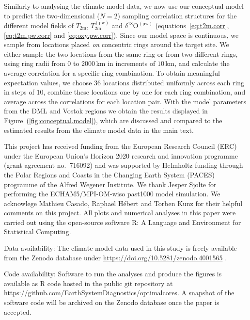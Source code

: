 \documentclass[draft]{agujournal2019}
\begin{document}
Similarly to analysing the climate model data, we now use our conceptual model
to predict the two-dimensional ($N=2$) sampling correlation structures for the
different model fields of $T_{\mathrm{2m}}$, $T_{\mathrm{2m}}^{\mathrm{(pw)}}$
and $\delta^{18}\mathrm{O}^{\mathrm{(pw)}}$ (equations~\ref{eq:t2m.corr},
\ref{eq:t2m.pw.corr} and \ref{eq:oxy.pw.corr}). Since our model space is
continuous, we sample from locations placed \emph{on} concentric rings around
the target site. We either sample the two locations from the same ring or from
two different rings, using ring radii from $0$ to $2000$\,km in increments of
$10$\,km, and calculate the average correlation for a specific ring
combination. To obtain meaningful expectation values, we choose $36$ locations
distributed uniformly across each ring in steps of $10$\textdegree, combine
these locations one by one for each ring combination, and average across the
correlations for each location pair. With the model parameters from the DML and
Vostok regions we obtain the results displayed in
Figure~(\ref{fig:conceptual.model}), which are discussed and compared to the
estimated results from the climate model data in the main text.

\acknowledgments
This project has received funding from the European Research Council (ERC) under
the European Union's Horizon 2020 research and innovation programme  (grant
agreement no.\ 716092) and was supported by Helmholtz funding through the Polar
Regions and Coasts in the Changing Earth System (PACES) programme of the Alfred
Wegener Institute. We thank Jesper Sjolte for performing the ECHAM5/MPI-OM-wiso
past1000 model simulation. We acknowlege Mathieu Casado, Rapha\"{e}l H\'{e}bert
and Torben Kunz for their helpful comments on this project. All plots and
numerical analyses in this paper were carried out using the open-source software
R: A Language and Environment for Statistical Computing.

Data availability: The climate model data used in this study is freely available
from the Zenodo database under \url{https://doi.org/10.5281/zenodo.4001565}
\cite{Munch2020}.

Code availability: Software to run the analyses and produce the figures is
available as R code hosted in the public git repository at
\url{https://github.com/EarthSystemDiagnostics/optimalcores}. A snapshot of the
software code will be archived on the Zenodo database once the paper is
accepted.


\end{document}
